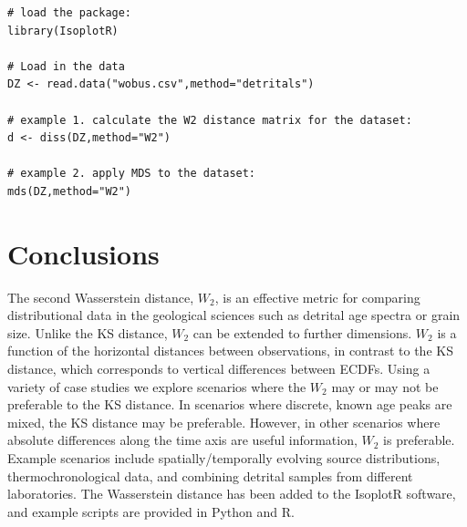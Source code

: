 \documentclass[gchron, manuscript]{copernicus}
\begin{document}
\begin{verbatim}
# load the package:
library(IsoplotR)

# Load in the data 
DZ <- read.data("wobus.csv",method="detritals")

# example 1. calculate the W2 distance matrix for the dataset:
d <- diss(DZ,method="W2") 

# example 2. apply MDS to the dataset:
mds(DZ,method="W2")
\end{verbatim}

\section{Conclusions}
 
The second Wasserstein distance, $W_2$, is an effective metric for comparing distributional data in the geological sciences such as detrital age spectra or grain size. Unlike the KS distance, $W_2$ can be extended to further dimensions. $W_2$ is a function of the horizontal distances between observations, in contrast to the KS distance, which corresponds to vertical differences between ECDFs. 
Using a variety of case studies we explore scenarios where the $W_2$ may or may not be preferable to the KS distance. In scenarios where discrete, known age peaks are mixed, the KS distance may be preferable. However, in other scenarios where absolute differences along the time axis are useful information, $W_2$ is preferable. Example scenarios include spatially/temporally evolving source distributions, thermochronological data, and combining detrital samples from different laboratories. The Wasserstein distance has been added to the IsoplotR software, and example scripts are provided in Python and R. 



\end{document}
